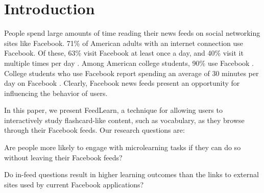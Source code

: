 \documentclass{sigchi}
\begin{document}
\section{Introduction}

People spend large amounts of time reading their news feeds on social networking sites like Facebook.
71\% of American adults with an internet connection use Facebook. Of these, 63\% visit Facebook at least once a day, and 40\% visit it multiple times per day \cite{socialmediaupdate}. Among American college students, 90\% use Facebook \cite{collegefacebook2}. College students who use Facebook report spending an average of 30 minutes per day on Facebook \cite{collegefacebook}. Clearly, Facebook news feeds present an opportunity for influencing the behavior of users.

In this paper, we present FeedLearn, a technique for allowing users to interactively study flashcard-like content, such as vocabulary, as they browse through their Facebook feeds. Our research questions are:

\begin{compactitem}
\item Are people more likely to engage with microlearning tasks if they can do so without leaving their Facebook feeds?
\item Do in-feed questions result in higher learning outcomes than the links to external sites used by current Facebook applications?
\end{compactitem}
\end{document}
